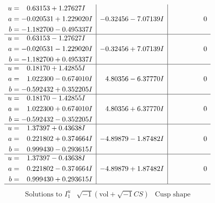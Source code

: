 \documentclass[1p]{elsarticle_modified}
\theoremstyle{definition}
\newcommand{\I}{\sqrt{-1}}
\begin{document}
$$\begin{array}{c|c|c}
\begin{aligned}
u &= \phantom{-}0.63153 + 1.27627 I \\
a &= -0.020531 + 1.229020 I \\
b &= -1.182700 - 0.495337 I\end{aligned}
 & -0.32456 - 7.07139 I & \phantom{-0.000000 } 0 \\ \hline\begin{aligned}
u &= \phantom{-}0.63153 - 1.27627 I \\
a &= -0.020531 - 1.229020 I \\
b &= -1.182700 + 0.495337 I\end{aligned}
 & -0.32456 + 7.07139 I & \phantom{-0.000000 } 0 \\ \hline\begin{aligned}
u &= \phantom{-}0.18170 + 1.42855 I \\
a &= \phantom{-}1.022300 - 0.674010 I \\
b &= -0.592432 + 0.352205 I\end{aligned}
 & \phantom{-}4.80356 - 6.37770 I & \phantom{-0.000000 } 0 \\ \hline\begin{aligned}
u &= \phantom{-}0.18170 - 1.42855 I \\
a &= \phantom{-}1.022300 + 0.674010 I \\
b &= -0.592432 - 0.352205 I\end{aligned}
 & \phantom{-}4.80356 + 6.37770 I & \phantom{-0.000000 } 0 \\ \hline\begin{aligned}
u &= \phantom{-}1.37397 + 0.43638 I \\
a &= \phantom{-}0.221802 + 0.374664 I \\
b &= \phantom{-}0.999430 - 0.293615 I\end{aligned}
 & -4.89879 - 1.87482 I & \phantom{-0.000000 } 0 \\ \hline\begin{aligned}
u &= \phantom{-}1.37397 - 0.43638 I \\
a &= \phantom{-}0.221802 - 0.374664 I \\
b &= \phantom{-}0.999430 + 0.293615 I\end{aligned}
 & -4.89879 + 1.87482 I & \phantom{-0.000000 } 0\\
 \hline 
 \end{array}$$\newpage$$\begin{array}{c|c|c}  
\text{Solutions to }I^u_{1}& \I (\text{vol} + \sqrt{-1}CS) & \text{Cusp shape}\\
 \hline 
\begin{aligned}

\end{aligned}
\end{array}$$
\end{document}
